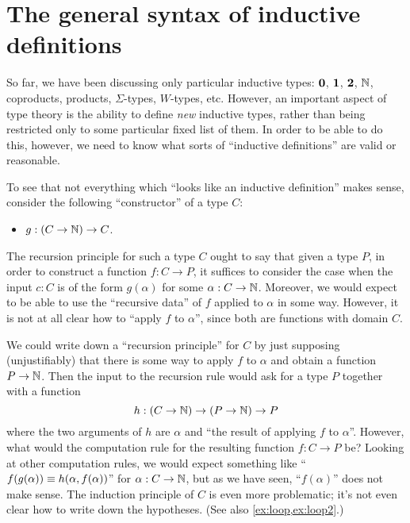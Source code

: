 
\section{The general syntax of inductive definitions}
\label{sec:strictly-positive}

So far, we have been discussing only particular inductive types: $\mathbf{0}$, $\mathbf{1}$, $\mathbf{2}$, $\mathbb{N}$, coproducts, products, $\Sigma$-types, $W$-types, etc.
However, an important aspect of type theory is the ability to define \emph{new} inductive types, rather than being restricted only to some particular fixed list of them.
In order to be able to do this, however, we need to know what sorts of ``inductive definitions'' are valid or reasonable.

To see that not everything which ``looks like an inductive definition'' makes sense, consider the following ``constructor'' of a type $C$:
\begin{itemize}
\item $g:(C\to \mathbb{N}) \to C$.
\end{itemize}
The recursion principle for such a type $C$ ought to say that given a type $P$, in order to construct a function $f:C\to P$, it suffices to consider the case when the input $c:C$ is of the form $g(\alpha)$ for some $\alpha:C\to\mathbb{N}$.
Moreover, we would expect to be able to use the ``recursive data'' of $f$ applied to $\alpha$ in some way.
However, it is not at all clear how to ``apply $f$ to $\alpha$'', since both are functions with domain $C$.

We could write down a ``recursion principle'' for $C$ by just supposing (unjustifiably) that there is some way to apply $f$ to $\alpha$ and obtain a function $P\to\mathbb{N}$.
Then the input to the recursion rule would ask for a type $P$ together with a function
\begin{equation}
  h:(C\to\nat) \to (P\to\nat) \to P\label{eq:fake-recursor}
\end{equation}
where the two arguments of $h$ are $\alpha$ and ``the result of applying $f$ to $\alpha$''.
However, what would the computation rule for the resulting function $f:C\to P$ be?
Looking at other computation rules, we would expect something like ``$f(g(\alpha)) \equiv h(\alpha,f(\alpha))$'' for $\alpha:C\to\mathbb{N}$, but as we have seen, ``$f(\alpha)$'' does not make sense.
The induction principle of $C$ is even more problematic; it's not even clear how to write down the hypotheses.
(See also \autoref{ex:loop,ex:loop2}.)

